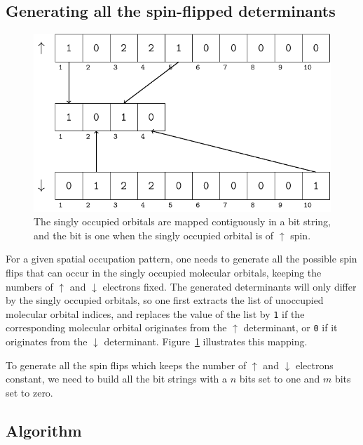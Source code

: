 \documentclass[aip,jcp,reprint,showkeys]{revtex4-1}
\newcommand{\up}{\uparrow}
\newcommand{\dn}{\downarrow}
\newcommand{\sop}{spatial occupation pattern}
\begin{document}
\subsection{Generating all the spin-flipped determinants}

\begin{figure}
\includegraphics[width=0.9\columnwidth]{mapping}
\caption{The singly occupied orbitals are mapped contiguously in a bit string,
and the bit is one when the singly occupied orbital is of $\up$ spin.}
\label{fig:mapping}
\end{figure}


For a given {\sop}, one needs to generate all the possible spin flips that can
occur in the singly occupied molecular orbitals, keeping the numbers of $\up$
and $\dn$ electrons fixed. The generated determinants will only differ by the
singly occupied orbitals,
so one first extracts the list of unoccupied molecular
orbital indices, and replaces the value of the list by 
\texttt{1} if the corresponding molecular orbital originates from the $\up$
determinant, or \texttt{0} if it originates from the $\dn$ determinant. 
Figure~\ref{fig:mapping} illustrates this mapping.

To generate all the spin flips which keeps the number of $\up$ and $\dn$
electrons constant, we need to build all the bit strings with a $n$
bits set to one and $m$ bits set to zero. %

\subsection{Algorithm}
\end{document}
